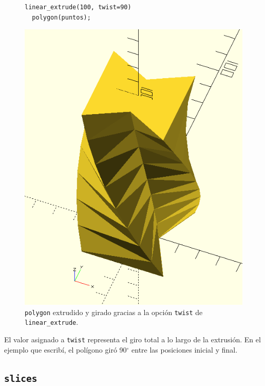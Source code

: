 \begin{figure}[ht]
\begin{minipage}[]{.6\textwidth}
\begin{lstlisting}
linear_extrude(100, twist=90)
  polygon(puntos);
    \end{lstlisting}
  \end{minipage}\hfill
  \begin{minipage}[]{.4\textwidth}%
      \centering
  \includegraphics[width=1\textwidth]{imagenes/extrusion-twist}
    \end{minipage}
  \caption{\lstinline!polygon! extrudido y girado gracias a la opción
    \lstinline!twist! de \lstinline!linear_extrude!.}
  \label{fig:extrusion-twist}
  \end{figure}

  
  \guillemotright El valor asignado a \lstinline!twist! representa el
  giro total a lo largo de la extrusión. En el ejemplo que escribí, el
  polígono giró 90$^{\circ}$ entre las posiciones inicial y final.


 \subsection{\texttt{slices}}


